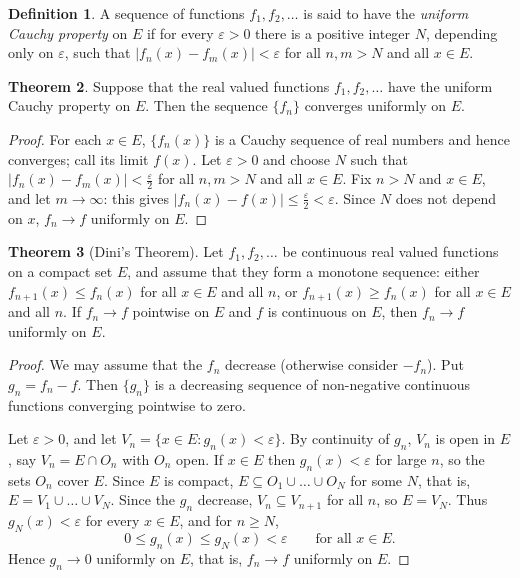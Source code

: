 \documentclass[11pt,a4paper]{article}
\numberwithin{equation}{section}
\theoremstyle{definition}
\newtheorem{thm}{Theorem}[subsection]
\newtheorem{defn}[thm]{Definition}
\begin{document}
\begin{defn}
A sequence of functions $f_1, f_2, \dots$ is said to have the \emph{uniform Cauchy property} on $E$ if for every $\varepsilon > 0$ there is a positive integer $N$, depending only on $\varepsilon$, such that $|f_n (x) - f_m(x)| < \varepsilon$ for all $n, m > N$ and all $x\in E$.
\end{defn}


\begin{thm}
Suppose that the real valued functions $f_1, f_2, \dots$ have the uniform Cauchy property on $E$. Then the sequence $\{f_n\}$ converges uniformly on $E$.
\end{thm}

\begin{proof}
For each $x\in E$, $\{f_n(x)\}$ is a Cauchy sequence of real numbers and hence converges; call its limit $f(x)$. Let $\varepsilon>0$ and choose $N$ such that $|f_n(x) - f_m(x)| < \frac{\varepsilon}{2}$ for all $n, m> N$ and all $x\in E$. Fix $n>N$ and $x\in E$, and let $m\longrightarrow \infty$: this gives $|f_n(x) - f(x)| \leq \frac{\varepsilon}{2} < \varepsilon$. Since $N$ does not depend on $x$, $f_n \longrightarrow f$ uniformly on $E$.
\end{proof}


\begin{thm}[Dini's Theorem]
Let $f_1, f_2, \dots$ be continuous real valued functions on a compact set $E$, and assume that they form a monotone sequence: either $f_{n+ 1}(x) \leq f_n(x)$ for all $x\in E$ and all $n$, or $f_{n+1}(x) \geq f_n(x)$ for all $x\in E$ and all $n$. If $f_n \longrightarrow f$ pointwise on $E$ and $f$ is continuous on $E$, then $f_n\longrightarrow f$ uniformly on $E$.
\end{thm}

\begin{proof}
We may assume that the $f_n$ decrease (otherwise consider $-f_n$). Put $g_n = f_n - f$. Then $\{g_n\}$ is a decreasing sequence of non-negative continuous functions converging pointwise to zero.

Let $\varepsilon > 0$, and let $V_n = \{x\in E: g_n(x) < \varepsilon\}$. By continuity of $g_n$, $V_n$ is open in $E$, say $V_n = E\cap O_n$ with $O_n$ open. If $x\in E$ then $g_n(x) < \varepsilon$ for large $n$, so the sets $O_n$ cover $E$. Since $E$ is compact, $E\subseteq O_1\cup\dots\cup O_N$ for some $N$, that is, $E = V_1\cup\dots\cup V_N$. Since the $g_n$ decrease, $V_n \subseteq V_{n + 1}$ for all $n$, so $E = V_N$. Thus $g_N(x) < \varepsilon$ for every $x\in E$, and for $n\geq N$,
$$0\leq g_n(x) \leq g_N(x) <\varepsilon \qquad\text{for all } x\in E .$$
Hence $g_n \longrightarrow 0$ uniformly on $E$, that is, $f_n\longrightarrow f$ uniformly on $E$.
\end{proof}
\end{document}
